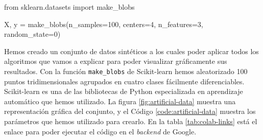 \begin{mypython}[float={h}, caption={Generar datos artificiales de prueba.}, label={code:artificial-data}]
  from sklearn.datasets import make_blobs

  X, y = make_blobs(n_samples=100, centers=4,
  n_features=3, random_state=0)
\end{mypython}

Hemos creado un conjunto de datos sintéticos a los cuales poder aplicar todos los algoritmos que vamos a explicar para poder visualizar gráficamente sus resultados. Con la función \texttt{make\_blobs} de Scikit-learn hemos aleatorizado 100 puntos tridimensionales agrupados en cuatro clases fácilmente diferenciables. Scikit-learn es una de las bibliotecas de Python especializada en aprendizaje automático que hemos utilizado. La figura \ref{fig:artificial-data} muestra una representación gráfica del conjunto, y el Código \ref{code:artificial-data} muestra los parámetros que hemos utilizado para crearlo. En la tabla \ref{tab:colab-links} está el enlace para poder ejecutar el código en el \textit{backend} de Google.

